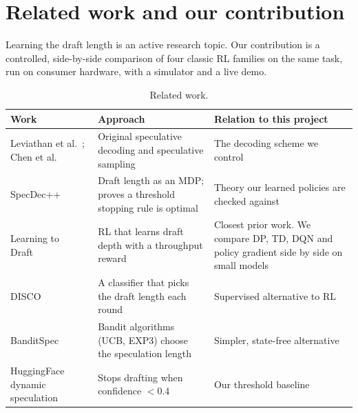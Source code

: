 \section{Related work and our contribution}

Learning the draft length is an active research topic. Our contribution is a controlled, side-by-side comparison of four classic RL families on the same task, run on consumer hardware, with a simulator and a live demo.

\begin{table}[h]
\centering
\caption{Related work.}
\label{tab:related}
\small
\begin{tabularx}{\linewidth}{@{}>{\raggedright}p{3.6cm}XX@{}}
\toprule
Work & Approach & Relation to this project \\
\midrule
Leviathan et al.~\citep{leviathan2023fast}; Chen et al.~\citep{chen2023accelerating} & Original speculative decoding and speculative sampling & The decoding scheme we control \\
SpecDec++~\citep{huang2024specdecpp} & Draft length as an MDP; proves a threshold stopping rule is optimal & Theory our learned policies are checked against \\
Learning to Draft~\citep{ltd2026} & RL that learns draft depth with a throughput reward & Closest prior work. We compare DP, TD, DQN and policy gradient side by side on small models \\
DISCO~\citep{mamou2024disco} & A classifier that picks the draft length each round & Supervised alternative to RL \\
BanditSpec~\citep{banditspec2025} & Bandit algorithms (UCB, EXP3) choose the speculation length & Simpler, state-free alternative \\
HuggingFace dynamic speculation~\citep{hfdynamic} & Stops drafting when confidence $< 0.4$ & Our threshold baseline \\
\bottomrule
\end{tabularx}
\end{table}
